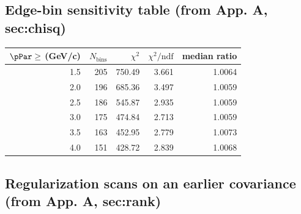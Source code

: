 \subsection{Edge-bin sensitivity table (from App. A, sec:chisq)}
\begin{center}
\begin{tabular}{@{}rrrrr@{}}
\toprule
$\pPar \ge$ (GeV/c) & $N_{\text{bins}}$ & $\chi^{2}$ & $\chi^{2}/\mathrm{ndf}$ & median ratio \\
\midrule
1.5 & 205 & 750.49 & 3.661 & 1.0064 \\
2.0 & 196 & 685.36 & 3.497 & 1.0059 \\
2.5 & 186 & 545.87 & 2.935 & 1.0059 \\
3.0 & 175 & 474.84 & 2.713 & 1.0059 \\
3.5 & 163 & 452.95 & 2.779 & 1.0073 \\
4.0 & 151 & 428.72 & 2.839 & 1.0068 \\
\bottomrule
\end{tabular}
\end{center}

\subsection{Regularization scans on an earlier covariance (from App. A, sec:rank)}
\begin{center}
\end{center}

